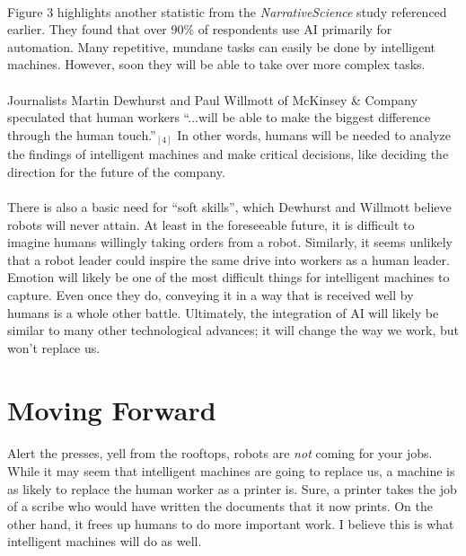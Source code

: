 \documentclass{article}
\begin{document}
    \paragraph{}
      Figure 3 highlights another statistic from the \textit{NarrativeScience}
      study referenced earlier. They found that over 90\% of respondents use AI
      primarily for automation. Many repetitive, mundane tasks can easily be
      done by intelligent machines. However, soon they will be able to take over
      more complex tasks.

    \paragraph{}
      Journalists Martin Dewhurst and Paul Willmott of McKinsey \& Company
      speculated that human workers ``...will be able to make the biggest difference
      through the human touch.''$_{[4]}$ In other words, humans will be needed to
      analyze the findings of intelligent machines and make critical
      decisions, like deciding the direction for the future of the company.

    \paragraph{}
      There is also a basic need for “soft skills”, which Dewhurst and Willmott
      believe robots will never attain. At least in the foreseeable future, it
      is difficult to imagine humans willingly taking orders from a robot.
      Similarly, it seems unlikely that a robot leader could inspire the same
      drive into workers as a human leader. Emotion will likely be one of the
      most difficult things for intelligent machines to capture. Even once they
      do, conveying it in a way that is received well by humans is a whole other
      battle. Ultimately, the integration of AI will likely be similar to many
      other technological advances; it will change the way we work, but won't
      replace us.

  \section{Moving Forward}
    \paragraph{}
      Alert the presses, yell from the rooftops, robots are \textit{not} coming
      for your jobs. While it may seem that intelligent machines are going to
      replace us, a machine is as likely to replace the human worker as a printer
      is. Sure, a printer takes the job of a scribe who would have written the
      documents that it now prints. On the other hand, it frees up humans to
      do more important work. I believe this is what intelligent machines will
      do as well.
\end{document}

